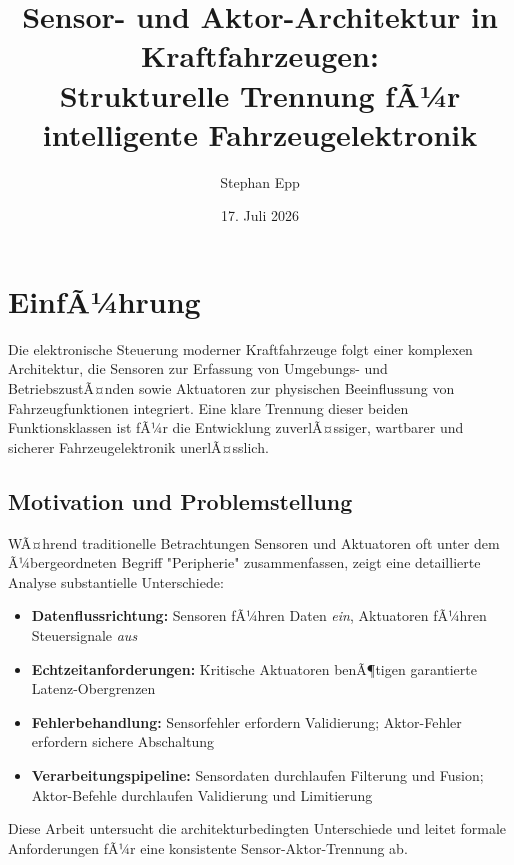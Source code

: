 ﻿\documentclass[a4paper,12pt]{article}
\title{Sensor- und Aktor-Architektur in Kraftfahrzeugen:\\Strukturelle Trennung fÃ¼r intelligente Fahrzeugelektronik}
\author{Stephan Epp}
\date{17. Juli 2026}
\begin{document}
\maketitle

\tableofcontents
\newpage

\section{EinfÃ¼hrung}

Die elektronische Steuerung moderner Kraftfahrzeuge folgt einer komplexen Architektur, die 
Sensoren zur Erfassung von Umgebungs- und BetriebszustÃ¤nden sowie Aktuatoren zur physischen 
Beeinflussung von Fahrzeugfunktionen integriert. Eine klare Trennung dieser beiden 
Funktionsklassen ist fÃ¼r die Entwicklung zuverlÃ¤ssiger, wartbarer und sicherer 
Fahrzeugelektronik unerlÃ¤sslich.

\subsection{Motivation und Problemstellung}

WÃ¤hrend traditionelle Betrachtungen Sensoren und Aktuatoren oft unter dem Ã¼bergeordneten 
Begriff "Peripherie" zusammenfassen, zeigt eine detaillierte Analyse substantielle 
Unterschiede:

\begin{itemize}
	\item \textbf{Datenflussrichtung:} Sensoren fÃ¼hren Daten \textit{ein}, Aktuatoren fÃ¼hren 
	Steuersignale \textit{aus}
	\item \textbf{Echtzeitanforderungen:} Kritische Aktuatoren benÃ¶tigen garantierte 
	Latenz-Obergrenzen
	\item \textbf{Fehlerbehandlung:} Sensorfehler erfordern Validierung; Aktor-Fehler 
	erfordern sichere Abschaltung
	\item \textbf{Verarbeitungspipeline:} Sensordaten durchlaufen Filterung und Fusion; 
	Aktor-Befehle durchlaufen Validierung und Limitierung
\end{itemize}

Diese Arbeit untersucht die architekturbedingten Unterschiede und leitet formale 
Anforderungen fÃ¼r eine konsistente Sensor-Aktor-Trennung ab.

\end{document}
